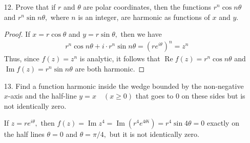 \documentclass{article}
\DeclareMathOperator{\re}{Re}
\DeclareMathOperator{\im}{Im}
\begin{document}
\begin{itemize}
\begin{enumerate}[(a)]
		\end{enumerate}

	\item[12.] Prove that if $r$ and $\theta$ are polar coordinates, then the functions $r^n \cos n\theta$ and $r^n\sin n\theta,$ where $n$ is an integer, are harmonic as functions of $x$ and $y.$
		\begin{proof}
			If $x=r\cos \theta$ and $y=r\sin \theta,$ then we have 
			\begin{align*}
				r^n\cos n\theta + i \cdot r^n\sin n\theta = \left( re^{i\theta} \right)^n = z^n
			\end{align*}
			Thus, since $f(z)=z^n$ is analytic, it follows that $\re f(z)=r^n\cos n\theta$ and $\im f(z) = r^n\sin n\theta$ are both harmonic.
		\end{proof}

	\item[13.] Find a function harmonic inside the wedge bounded by the non-negative $x$-axis and the half-line $y=x\quad(x\ge 0)$ that goes to 0 on these sides but is not identically zero. 
		\begin{soln}
			If $z=re^{i\theta},$ then $f(z)=\im z^4=\im (r^4e^{4\theta i})= r^4\sin 4\theta=0$ exactly on the half lines $\theta=0$ and $\theta=\pi/4,$ but it is not identically zero. 
		\end{soln}

\end{itemize}
\end{document}
